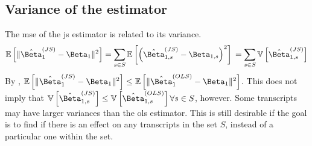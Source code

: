 \subsection{Variance of the  estimator}

The \gls{mse} of the \gls{js} estimator is related to its variance.
%
\begin{equation*}
  \expect{ \Vert \hat{\Beta}_1^{(JS)} - \Beta_1 \Vert ^2 }
  = \sum_{s \in S} \expect{ \left( \hat{\Beta}_{1,s}^{(JS)} - \Beta_{1,s} \right)^2 } \\
  = \sum_{s \in S} \variance{ \hat{\Beta}_{1,s}^{(JS)} }
\end{equation*}
%
By \cite[REF][]{bockMinimaxEstimatorsMean1975}, $\mathbb{E} \left[ \Vert \hat{\Beta}_1^{(JS)} - \Beta_1 \Vert ^2\right] \le \mathbb{E} \left[ \Vert \hat{\Beta}_1^{(OLS)} - \Beta_1 \Vert ^2\right]$.
This does not imply that $\variance{ \hat{\Beta}_{1,s}^{(JS)} } \le \variance{ \hat{\Beta}_{1,s}^{(OLS)} } \forall s \in S$, however.
Some transcripts may have larger variances than the \gls{ols} estimator.
This is still desirable if the goal is to find if there is an effect on any transcripts in the set $S$, instead of a particular one within the set.

